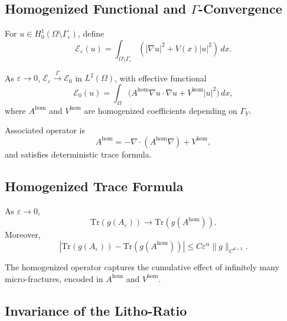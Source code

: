 \subsection{Homogenized Functional and $\Gamma$-Convergence}

\begin{definition}
For $u \in H^1_0(\Omega\setminus\Gamma_\varepsilon)$, define
\[
\mathcal{E}_\varepsilon(u) = \int_{\Omega\setminus\Gamma_\varepsilon} (|\nabla u|^2 + V(x)|u|^2)\,dx.
\]
\end{definition}

\begin{theorem}
\label{thm:gamma-conv}
As $\varepsilon\to 0$, $\mathcal{E}_\varepsilon \stackrel{\Gamma}{\to} \mathcal{E}_0$ in $L^2(\Omega)$,  
with effective functional
\[
\mathcal{E}_0(u) = \int_{\Omega} \big( A^{\mathrm{hom}} \nabla u \cdot \nabla u + V^{\mathrm{hom}} |u|^2 \big)\,dx,
\]
where $A^{\mathrm{hom}}$ and $V^{\mathrm{hom}}$ are homogenized coefficients depending on $\Gamma_Y$. 
\end{theorem}

\begin{corollary}
Associated operator is
\[
A^{\mathrm{hom}} = -\nabla \cdot (A^{\mathrm{hom}} \nabla) + V^{\mathrm{hom}},
\]
and satisfies deterministic trace formula. 
\end{corollary}

\subsection{Homogenized Trace Formula}

\begin{theorem}
\label{thm:hom-trace}
As $\varepsilon \to 0$,
\[
\mathrm{Tr}(g(A_\varepsilon)) \to \mathrm{Tr}(g(A^{\mathrm{hom}})).
\]
Moreover,
\[
\left| \mathrm{Tr}(g(A_\varepsilon)) - \mathrm{Tr}(g(A^{\mathrm{hom}})) \right|
\leq C \varepsilon^\alpha \|g\|_{C^{d+3}}.
\]
\end{theorem}

\begin{remark}
The homogenized operator captures the cumulative effect of infinitely many micro-fractures, encoded in $A^{\mathrm{hom}}$ and $V^{\mathrm{hom}}$. 
\end{remark}

\subsection{Invariance of the Litho-Ratio}

